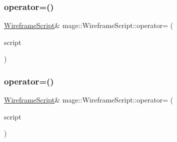 \hypertarget{classmage_1_1_wireframe_script_a0382415dade9f889b1edebf2ee5aa770}{}\label{classmage_1_1_wireframe_script_a0382415dade9f889b1edebf2ee5aa770} 
\subsubsection{\texorpdfstring{operator=()}{operator=()}\hspace{0.1cm}{\footnotesize\ttfamily [1/2]}}
{\footnotesize\ttfamily \hyperlink{classmage_1_1_wireframe_script}{Wireframe\+Script}\& mage\+::\+Wireframe\+Script\+::operator= (\begin{DoxyParamCaption}\item[{const \hyperlink{classmage_1_1_wireframe_script}{Wireframe\+Script} \&}]{script }\end{DoxyParamCaption})\hspace{0.3cm}{\ttfamily [delete]}}

\hypertarget{classmage_1_1_wireframe_script_a6be79bd5b62f7cf6e9d1237dba0a5bdc}{}\label{classmage_1_1_wireframe_script_a6be79bd5b62f7cf6e9d1237dba0a5bdc} 
\subsubsection{\texorpdfstring{operator=()}{operator=()}\hspace{0.1cm}{\footnotesize\ttfamily [2/2]}}
{\footnotesize\ttfamily \hyperlink{classmage_1_1_wireframe_script}{Wireframe\+Script}\& mage\+::\+Wireframe\+Script\+::operator= (\begin{DoxyParamCaption}\item[{\hyperlink{classmage_1_1_wireframe_script}{Wireframe\+Script} \&\&}]{script }\end{DoxyParamCaption})\hspace{0.3cm}{\ttfamily [delete]}}

\hypertarget{classmage_1_1_wireframe_script_a0905da00e545cc219c479fe5a89b5a7f}{}\label{classmage_1_1_wireframe_script_a0905da00e545cc219c479fe5a89b5a7f} 
